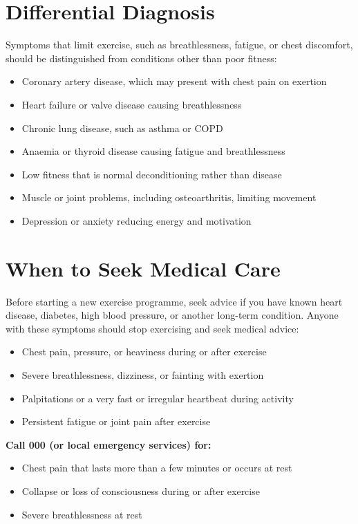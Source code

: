 \section*{Differential Diagnosis}
Symptoms that limit exercise, such as breathlessness, fatigue, or chest discomfort, should be distinguished from conditions other than poor fitness:
\begin{itemize}
    \item Coronary artery disease, which may present with chest pain on exertion
    \item Heart failure or valve disease causing breathlessness
    \item Chronic lung disease, such as asthma or COPD
    \item Anaemia or thyroid disease causing fatigue and breathlessness
    \item Low fitness that is normal deconditioning rather than disease
    \item Muscle or joint problems, including osteoarthritis, limiting movement
    \item Depression or anxiety reducing energy and motivation
\end{itemize}

\section*{When to Seek Medical Care}
Before starting a new exercise programme, seek advice if you have known heart disease, diabetes, high blood pressure, or another long-term condition. Anyone with these symptoms should stop exercising and seek medical advice:
\begin{itemize}
    \item Chest pain, pressure, or heaviness during or after exercise
    \item Severe breathlessness, dizziness, or fainting with exertion
    \item Palpitations or a very fast or irregular heartbeat during activity
    \item Persistent fatigue or joint pain after exercise
\end{itemize}
\textbf{Call 000 (or local emergency services) for:}
\begin{itemize}
    \item Chest pain that lasts more than a few minutes or occurs at rest
    \item Collapse or loss of consciousness during or after exercise
    \item Severe breathlessness at rest
\end{itemize}

